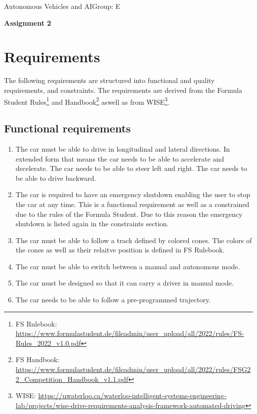 \documentclass[12pt,a4paper,german]{article}
\def \name {Autonomous Vehicles and AI}					%
\def \gruppe {E}					%
\def \uebung {2}								%
\newcommand{\hwsol}{
\vspace*{-2cm}
\noindent \name \hfill Group: \gruppe \\
\begin{center}{\Large \bf Assignment \uebung}\end{center}
}
\begin{document}
\hwsol


\section{Requirements}
    The following requirements are structured into functional and quality requirements, and constraints. The requirements are derived from the 
    Formula Student Rules\footnote{\label{rules-book} FS Rulebook: \url{https://www.formulastudent.de/fileadmin/user_upload/all/2022/rules/FS-Rules_2022_v1.0.pdf}} 
    and Handbook\footnote{\label{handbook} FS Handbook: \url{https://www.formulastudent.de/fileadmin/user_upload/all/2022/rules/FSG22_Competition_Handbook_v1.1.pdf}} aswell as from 
    WISE\footnote{\label{wise} WISE: \url{https://uwaterloo.ca/waterloo-intelligent-systems-engineering-lab/projects/wise-drive-requirements-analysis-framework-automated-driving}}. 
    \subsection{Functional requirements}
    \begin{enumerate}[label=\arabic*.]
        \item The car must be able to drive in longitudinal and lateral directions. In extended form that means the car needs to be able to accelerate and decelerate. The car needs to be able to steer left and right. The car needs to be able to drive backward.
        \item The car is required to have an emergency shutdown enabling the user to stop the car at any time. This is a functional requirement as well as a constrained due to the rules of the Formula Student. Due to this reason the emergency shutdown is listed again in the constraints section.
        \item The car must be able to follow a track defined by colored cones. The colors of the cones as well as their relaitve position is defined in FS Rulebook.
        \item The car must be able to switch between a manual and autonomous mode.
        \item The car must be designed so that it can carry a driver in manual mode.
        \item The car needs to be able to follow a pre-programmed trajectory.
    \end{enumerate}
\end{document}
